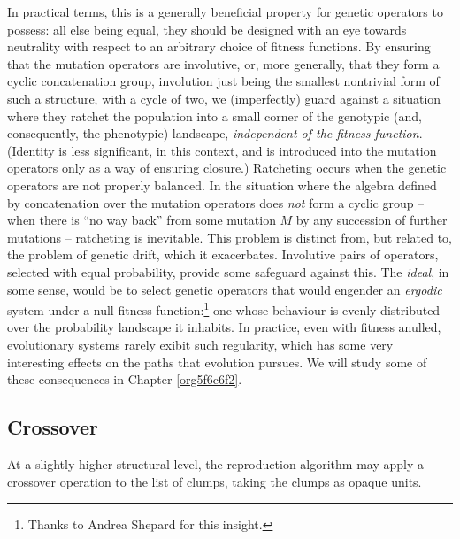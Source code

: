 \documentclass[12pt,glossary]{dalthesis}
\begin{document}
In practical terms, this is a generally beneficial property for genetic
operators to possess: all else being equal, they should be designed with
an eye towards neutrality with respect to an arbitrary choice of fitness
functions. By ensuring that the mutation operators are involutive, or, more
generally, that they form a cyclic concatenation group, involution just being
the smallest nontrivial form of such a structure, with a cycle of two, we
(imperfectly) guard against a situation where they ratchet the population into a
small corner of the genotypic (and, consequently, the phenotypic) landscape,
\emph{independent of the fitness function}. (Identity is less significant, in this
context, and is introduced into the mutation operators only
as a way of ensuring closure.) Ratcheting occurs when the genetic
operators are not properly balanced. In the situation where the algebra defined
by concatenation over the mutation operators does \emph{not} form a cyclic group --
when there is ``no way back'' from some mutation \(M\) by any succession of further
mutations -- ratcheting is inevitable. This problem is distinct from, but
related to, the problem of genetic drift, which it exacerbates. Involutive pairs
of operators, selected with equal probability, provide some safeguard against
this. The \emph{ideal}, in some sense, would be to select genetic operators that
would engender an \emph{ergodic} system under a null fitness function:\footnote{Thanks to
Andrea Shepard for this insight.} one whose behaviour is evenly distributed
over the probability landscape it inhabits. In practice, even with fitness
anulled, evolutionary systems rarely exibit such regularity, which has some very
interesting effects on the paths that evolution pursues. We will study some of
these consequences in Chapter \ref{org5f6c6f2}.


\subsection{Crossover}
\label{sec:org2d68eae}
\label{orge3d7d36} 

At a slightly higher structural level, the reproduction
algorithm may apply a crossover operation to the list of clumps, taking the
clumps as opaque units.
\end{document}
